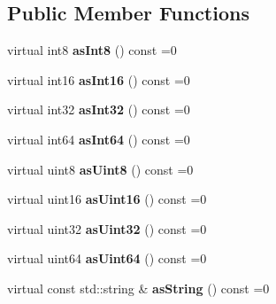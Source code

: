 \subsection*{Public Member Functions}
\begin{DoxyCompactItemize}
\item 
virtual int8 {\bfseries as\+Int8} () const  =0\hypertarget{class_a_p_i_kachu_1_1_i_config_value_a170f4b3109560e82e8c909d9bc70d942}{}\label{class_a_p_i_kachu_1_1_i_config_value_a170f4b3109560e82e8c909d9bc70d942}

\item 
virtual int16 {\bfseries as\+Int16} () const  =0\hypertarget{class_a_p_i_kachu_1_1_i_config_value_aba1294d7aa777eaecb60510bd91a6644}{}\label{class_a_p_i_kachu_1_1_i_config_value_aba1294d7aa777eaecb60510bd91a6644}

\item 
virtual int32 {\bfseries as\+Int32} () const  =0\hypertarget{class_a_p_i_kachu_1_1_i_config_value_aae8f3229a9cff122ba2dc752bcb65112}{}\label{class_a_p_i_kachu_1_1_i_config_value_aae8f3229a9cff122ba2dc752bcb65112}

\item 
virtual int64 {\bfseries as\+Int64} () const  =0\hypertarget{class_a_p_i_kachu_1_1_i_config_value_a74927e653905be1f9f15994724124917}{}\label{class_a_p_i_kachu_1_1_i_config_value_a74927e653905be1f9f15994724124917}

\item 
virtual uint8 {\bfseries as\+Uint8} () const  =0\hypertarget{class_a_p_i_kachu_1_1_i_config_value_a50063412955139f298da3298f4a70592}{}\label{class_a_p_i_kachu_1_1_i_config_value_a50063412955139f298da3298f4a70592}

\item 
virtual uint16 {\bfseries as\+Uint16} () const  =0\hypertarget{class_a_p_i_kachu_1_1_i_config_value_a76799e2bf46e60655cfe33b51b8fbc15}{}\label{class_a_p_i_kachu_1_1_i_config_value_a76799e2bf46e60655cfe33b51b8fbc15}

\item 
virtual uint32 {\bfseries as\+Uint32} () const  =0\hypertarget{class_a_p_i_kachu_1_1_i_config_value_a61caa2c6d310d4ef4fc96e1cbf70f97f}{}\label{class_a_p_i_kachu_1_1_i_config_value_a61caa2c6d310d4ef4fc96e1cbf70f97f}

\item 
virtual uint64 {\bfseries as\+Uint64} () const  =0\hypertarget{class_a_p_i_kachu_1_1_i_config_value_aa68a9f29da972cbfe9078a097b7febf4}{}\label{class_a_p_i_kachu_1_1_i_config_value_aa68a9f29da972cbfe9078a097b7febf4}

\item 
virtual const std\+::string \& {\bfseries as\+String} () const  =0\hypertarget{class_a_p_i_kachu_1_1_i_config_value_a3ab39fb92e9f1be64e92a672a4bd8632}{}\label{class_a_p_i_kachu_1_1_i_config_value_a3ab39fb92e9f1be64e92a672a4bd8632}

\end{DoxyCompactItemize}


